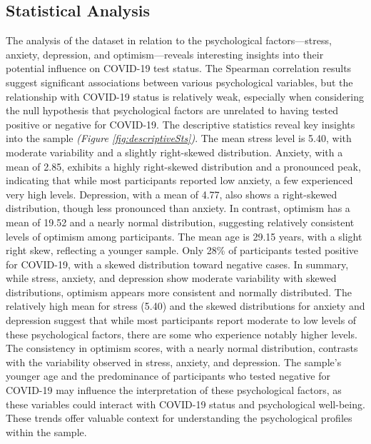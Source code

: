 \documentclass[a4paper]{article}
\begin{document}
\vspace{1em}
\subsection{Statistical Analysis}
\vspace{0.5em}
The analysis of the dataset in relation to the psychological factors—stress, anxiety, depression, and optimism—reveals interesting insights into their potential influence on COVID-19 test status.
The Spearman correlation results suggest significant associations between various psychological variables, but the relationship with COVID-19 status is relatively weak,
especially when considering the null hypothesis that psychological factors are unrelated to having tested positive or negative for COVID-19.
\vspace{0.5em}\newline
The descriptive statistics reveal key insights into the sample \textit{(Figure \ref{fig:descriptiveSts})}. 
The mean stress level is 5.40, with moderate variability and a slightly right-skewed distribution. Anxiety, with a mean of 2.85, exhibits a highly right-skewed distribution and a pronounced peak,
indicating that while most participants reported low anxiety, a few experienced very high levels.
Depression, with a mean of 4.77, also shows a right-skewed distribution, though less pronounced than anxiety.
In contrast, optimism has a mean of 19.52 and a nearly normal distribution, suggesting relatively consistent levels of optimism among participants.\newline
The mean age is 29.15 years, with a slight right skew, reflecting a younger sample.
Only 28\% of participants tested positive for COVID-19, with a skewed distribution toward negative cases.\newline
In summary, while stress, anxiety, and depression show moderate variability with skewed distributions, optimism appears more consistent and normally distributed.\newline 
The relatively high mean for stress (5.40) and the skewed distributions for anxiety and depression suggest that while most participants report moderate
to low levels of these psychological factors, there are some who experience notably higher levels.
The consistency in optimism scores, with a nearly normal distribution, contrasts with the variability observed in stress, anxiety, and depression.\newline
The sample's younger age and the predominance of participants who tested negative for COVID-19 may influence the interpretation of these psychological factors,
as these variables could interact with COVID-19 status and psychological well-being.\newline
These trends offer valuable context for understanding the psychological profiles within the sample.
\vspace{1.5em}
\end{document}
